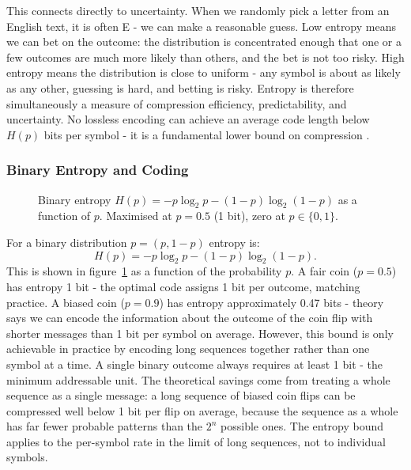 This connects directly to uncertainty. When we randomly pick a letter from an English text, it is often E - we can make a reasonable guess. Low entropy means we can bet on the outcome: the distribution is concentrated enough that one or a few outcomes are much more likely than others, and the bet is not too risky. High entropy means the distribution is close to uniform - any symbol is about as likely as any other, guessing is hard, and betting is risky. Entropy is therefore simultaneously a measure of compression efficiency, predictability, and uncertainty. No lossless encoding can achieve an average code length below $H(p)$ bits per symbol - it is a fundamental lower bound on compression \parencite{Shannon1948}.

\subsubsection{Binary Entropy and Coding}

\begin{figure}
\centering
{}
\resizebox{0.36\textwidth}{!}{}
\caption{Binary entropy $H(p) = -p\log_2 p - (1-p)\log_2(1-p)$ as a function of $p$. Maximised at $p=0.5$ (1 bit), zero at $p \in \{0,1\}$.}
\label{fig:binary_entropy}
\end{figure}

For a binary distribution $p = (p, 1-p)$ entropy is:
\begin{equation}
    H(p) = -p\log_2 p - (1-p)\log_2(1-p).
\end{equation}
This is shown in figure~\ref{fig:binary_entropy} as a function of the probability $p$. A fair coin ($p=0.5$) has entropy 1 bit - the optimal code assigns 1 bit per outcome, matching practice. A biased coin ($p=0.9$) has entropy approximately 0.47 bits - theory says we can encode the information about the outcome of the coin flip with shorter messages than 1 bit per symbol on average. However, this bound is only achievable in practice by encoding long sequences together rather than one symbol at a time. A single binary outcome always requires at least 1 bit - the minimum addressable unit. The theoretical savings come from treating a whole sequence as a single message: a long sequence of biased coin flips can be compressed well below 1 bit per flip on average, because the sequence as a whole has far fewer probable patterns than the $2^n$ possible ones. The entropy bound applies to the per-symbol rate in the limit of long sequences, not to individual symbols.

